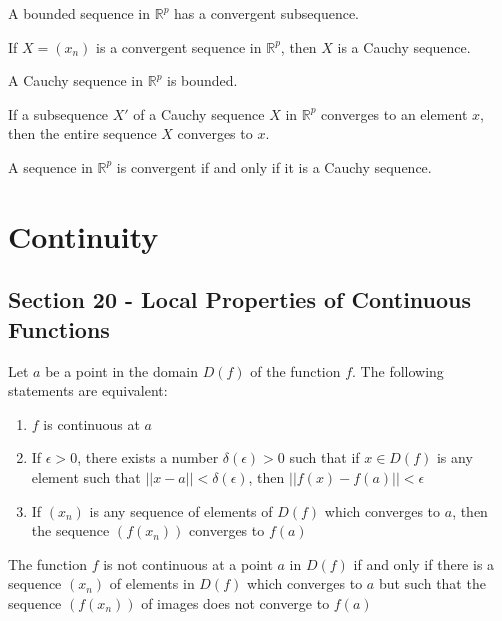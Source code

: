\documentclass[12pt]{article}
\newcommand{\R}{\mathbb{R}}
\newenvironment{theorem}[2][Theorem]{\begin{trivlist}
\item[\hskip \labelsep {\bfseries #1}\hskip \labelsep {\bfseries #2.}]}{\end{trivlist}}
\newenvironment{lemma}[2][Lemma]{\begin{trivlist}
\item[\hskip \labelsep {\bfseries #1}\hskip \labelsep {\bfseries #2.}]}{\end{trivlist}}
\begin{document}
\begin{theorem}[Bolzano-Weierstrass]{Theorem}
A bounded sequence in $\R^p$ has a convergent subsequence.
\end{theorem}

\begin{lemma}{16.7}
If $X = (x_n)$ is a convergent sequence in $\R^p$, then $X$ is a Cauchy sequence.
\end{lemma}

\begin{lemma}{16.8}
A Cauchy sequence in $\R^p$ is bounded.
\end{lemma}

\begin{lemma}{16.9}
If a subsequence $X'$ of a Cauchy sequence $X$ in $\R^p$ converges to an element $x$, then the entire sequence $X$ converges to $x$.
\end{lemma}

\begin{theorem}[Cauchy Convergence]{Criterion}
A sequence in $\R^p$ is convergent if and only if it is a Cauchy sequence.
\end{theorem}
\newpage
\section{Continuity}

\subsection*{Section 20 - Local Properties of Continuous Functions}

\begin{theorem}{20.2}
Let $a$ be a point in the domain $D(f)$ of the function $f$. The following statements are equivalent:
\begin{enumerate}[label=\alph*)]
\item $f$ is continuous at $a$
\item If $\epsilon > 0$, there exists a number $\delta(\epsilon) > 0$ such that if $x \in D(f)$ is any element such that $||x - a|| < \delta(\epsilon)$, then $||f(x) - f(a)|| < \epsilon$
\item If $(x_n)$ is any sequence of elements of $D(f)$ which converges to $a$, then the sequence $(f(x_n))$ converges to $f(a)$
\end{enumerate}
\end{theorem}

\begin{theorem}[Discontinuity]{Criterion}
The function $f$ is not continuous at a point $a$ in $D(f)$ if and only if there is a sequence $(x_n)$ of elements in $D(f)$ which converges to $a$ but such that the sequence $(f(x_n))$ of images does not converge to $f(a)$
\end{theorem}
\end{document}
